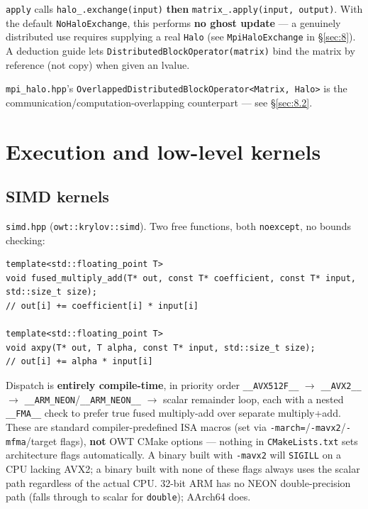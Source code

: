 \documentclass[11pt,a4paper]{report}
\newcommand{\secref}[1]{\S\ref{#1}}
\begin{document}
\lstinline!apply! calls \lstinline!halo_.exchange(input)! \textbf{then}
\lstinline!matrix_.apply(input, output)!. With the default \lstinline!NoHaloExchange!,
this performs \textbf{no ghost update} --- a genuinely distributed use
requires supplying a real \lstinline!Halo! (see \lstinline!MpiHaloExchange! in
\secref{sec:8}). A deduction guide lets \lstinline!DistributedBlockOperator(matrix)!
bind the matrix by reference (not copy) when given an lvalue.

\texttt{mpi\_halo.hpp}'s \lstinline!OverlappedDistributedBlockOperator<Matrix, Halo>!
is the communication/computation-overlapping counterpart --- see
\secref{sec:8.2}.

\chapter{Execution and low-level kernels}
\label{sec:4}

\section{SIMD kernels}
\label{sec:4.1}

\texttt{simd.hpp} (\lstinline!owt::krylov::simd!). Two free functions, both
\lstinline!noexcept!, no bounds checking:

\begin{lstlisting}
template<std::floating_point T>
void fused_multiply_add(T* out, const T* coefficient, const T* input, std::size_t size);
// out[i] += coefficient[i] * input[i]

template<std::floating_point T>
void axpy(T* out, T alpha, const T* input, std::size_t size);
// out[i] += alpha * input[i]
\end{lstlisting}

Dispatch is \textbf{entirely compile-time}, in priority order
\lstinline!__AVX512F__! $\to$ \lstinline!__AVX2__! $\to$
\lstinline!__ARM_NEON!/\lstinline!__ARM_NEON__! $\to$ scalar remainder loop,
each with a nested \lstinline!__FMA__! check to prefer true fused
multiply-add over separate multiply+add. These are standard
compiler-predefined ISA macros (set via \lstinline!-march=!/\lstinline!-mavx2!/\lstinline!-mfma!/target
flags), \textbf{not} OWT CMake options --- nothing in \texttt{CMakeLists.txt}
sets architecture flags automatically. A binary built with
\lstinline!-mavx2! will \texttt{SIGILL} on a CPU lacking AVX2; a binary built
with none of these flags always uses the scalar path regardless of the
actual CPU. 32-bit ARM has no NEON double-precision path (falls through
to scalar for \texttt{double}); AArch64 does.
\end{document}
